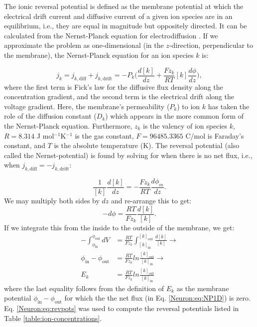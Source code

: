 The ionic reversal potential is defined as the membrane potential at which the electrical drift current and diffusive current of a given ion species are in an equilibrium, i.e., they are equal in magnitude but oppositely directed. It can be calculated from the Nernst-Planck equation for electrodiffusion . If we approximate the problem as one-dimensional (in the $z$-direction, perpendicular to the membrane), the Nernst-Planck equation for an ion species $k$ is:

\begin{equation}
j_k = j_{k,\text{diff}} + j_{k,\text{drift}} 
=  - P_k \Big(\frac{d[k]}{dz} +  \frac{Fz_k}{RT}  [k] \frac{d\phi}{dz} \Big), 
\label{Neuron:eq:NP1D}
\end{equation}
where the first term is Fick's law for the diffusive flux density along the concentration gradient, and the second term is the electrical drift along the voltage gradient. Here, the membrane's permeability ($P_k$) to ion $k$ has taken the role of the diffusion constant ($D_k$) which appears in the more common form of the Nernst-Planck equation. Furthermore, $z_{k}$ is the valency of ion species $k$, $R = 8.314$ J mol$^{-1}$K$^{-1}$ is the gas constant, $F = 96485.3365$ C/mol is Faraday's constant, and $T$ is the absolute temperature (K). The reversal potential (also called the Nernst-potential) is found by solving for when there is no net flux, i.e., when  $j_{k,\text{diff}} = - j_{k,\text{drift}}$:

\begin{equation}
\frac{1}{[k]} \frac{d[k]}{dz} = - \frac{Fz_k}{RT}  \frac{d\phi_m}{dz}.
\end{equation}
We may multiply both sides by $dz$ and re-arrange this to get:
\begin{equation}
-d\phi = \frac{RT}{Fz_k}  \frac{d[k]}{[k]}.
\end{equation}
If we integrate this from the inside to the outside of the membrane, we get:
\begin{align}
-\int_{\phi_{\text{in}}}^{\phi_{\text{out}}}  dV &= \frac{RT}{Fz_k}  \int_{[k]_{\text{in}}}^{[k]_{\text{out}}} \frac{d[k]}{[k]} \rightarrow \\
\phi_{\text{in}}-\phi_{\text{out}} &= \frac{RT}{Fz_k} ln \frac{[k]_{\text{out}}} {[k]_{\text{in}}} \rightarrow \\
E_k & =  \frac{RT}{Fz_k}  ln \frac{[k]_{\text{out}}} {[k]_{\text{in}}} 
\label{Neuron:eq:revpots}
\end{align}
where the last equality follows from the definition of $E_k$ as the membrane potential $\phi_{\text{in}}-\phi_{\text{out}}$ for which the the net flux (in Eq. \ref{Neuron:eq:NP1D}) is zero. Eq. \ref{Neuron:eq:revpots} was used to compute the reversal potentials listed in Table \ref{table:ion-concentrations}. 

